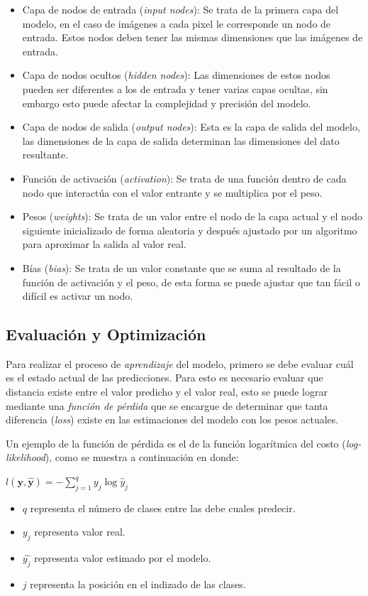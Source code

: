 \begin{itemize}
    \item Capa de nodos de entrada (\emph{input nodes}): Se trata de la primera capa del modelo, en el caso de imágenes a cada pixel le corresponde un nodo de entrada. Estos nodos deben tener las mismas dimensiones que las imágenes de entrada.
    \item Capa de nodos ocultos (\emph{hidden nodes}): Las dimensiones de estos nodos pueden ser diferentes a los de entrada y tener varias capas ocultas, sin embargo esto puede afectar la complejidad y precisión del modelo.
    \item Capa de nodos de salida (\emph{output nodes}): Esta es la capa de salida del modelo, las dimensiones de la capa de salida determinan las dimensiones del dato resultante.
    \item Función de activación (\emph{activation}): Se trata de una función dentro de cada nodo que interactúa con el valor entrante y se multiplica por el peso.
    \item Pesos (\emph{weights}): Se trata de un valor entre el nodo de la capa actual y el nodo siguiente inicializado de forma aleatoria y después ajustado por un algoritmo para aproximar la salida al valor real.
    \item Bías (\emph{bias}): Se trata de un valor constante que se suma al resultado de la función de activación y el peso, de esta forma se puede ajustar que tan fácil o difícil es activar un nodo.
\end{itemize}


\subsection{Evaluación y Optimización}
Para realizar el proceso de \emph{aprendizaje} del modelo, primero se debe evaluar cuál es el estado actual de las predicciones. Para esto es necesario evaluar que distancia existe entre el valor predicho y el valor real, esto se puede lograr mediante una \emph{función de pérdida} que se encargue de determinar que tanta diferencia (\emph{loss}) existe en las estimaciones del modelo con los pesos actuales.

Un ejemplo de la función de pérdida es el de la función logarítmica del costo (\emph{log-likelihood}), como se muestra a continuación en donde:

$l(\mathbf{y}, \hat{\mathbf{y}}) = - \sum_{j=1}^q y_j \log \hat{y}_j$ 

\begin{itemize}
    \item $q$ representa el número de clases entre las debe cuales predecir.
    \item $y_j$ representa valor real.
    \item $\hat{y_j}$ representa valor estimado por el modelo.
    \item $j$ representa la posición en el indizado de las clases.
\end{itemize}

